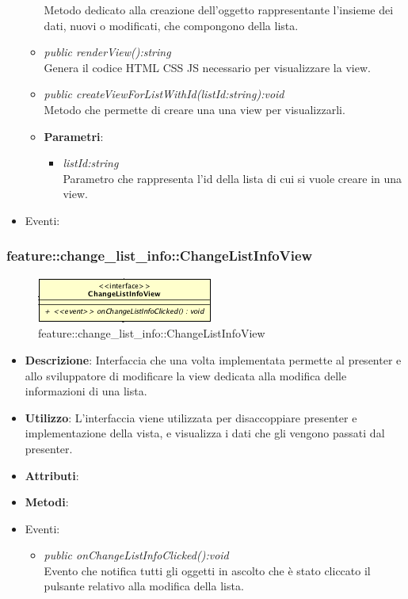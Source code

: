 \begin{itemize}
\begin{itemize}
	 	Metodo dedicato alla creazione dell'oggetto rappresentante l'insieme dei dati, nuovi o modificati, che compongono della lista.
	\item \textit{public renderView():string}\\
	Genera il codice HTML CSS JS necessario per visualizzare la view.
	\item \textit{public createViewForListWithId(listId:string):void}\\
		Metodo che permette di creare una una view per visualizzarli.
			\item{\textbf{Parametri}: \begin{itemize}
			\item \textit{listId:string}\\
			Parametro che rappresenta l'id della lista di cui si vuole creare in una view.
			\end{itemize}}
	\end{itemize}
\item{Eventi}:
\end{itemize}

\subsubsection{feature::change\_list\_info::ChangeListInfoView}

\label{feature::change_list_info::ChangeListInfoView}
\begin{figure}[ht]
	\centering
	\includegraphics[scale=0.5]{Sezioni/SottosezioniST/img/app/ChangeListInfoView.png}
	\caption{feature::change\_list\_info::ChangeListInfoView}
\end{figure}

\begin{itemize}
\item \textbf{Descrizione}: Interfaccia che una volta implementata permette al presenter e allo sviluppatore di modificare la view dedicata alla modifica delle informazioni di una lista.
\item \textbf{Utilizzo}: L'interfaccia viene utilizzata per disaccoppiare presenter e implementazione della vista, e visualizza i dati che gli vengono passati dal presenter.
\item \textbf{Attributi}: 
\item \textbf{Metodi}:
\item{Eventi}:
	\begin{itemize}	
	\item \textit{public onChangeListInfoClicked():void}\\
		Evento che notifica tutti gli oggetti in ascolto che è stato cliccato il pulsante relativo alla modifica della lista.
	\end{itemize}
\end{itemize}

